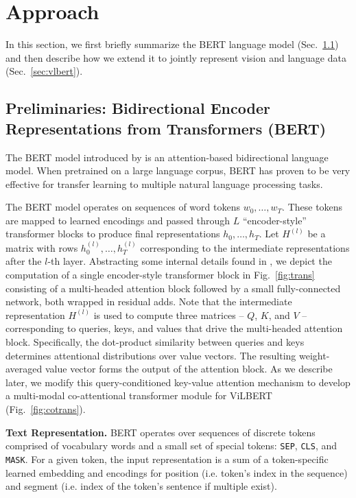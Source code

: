 \section{Approach}
\label{sec:app}

In this section, we first briefly summarize the BERT language model (Sec.~\ref{sec:bert}) and then describe how we extend it to jointly represent vision and language data (Sec.~\ref{sec:vlbert}).

\subsection{Preliminaries: Bidirectional Encoder Representations from Transformers (BERT)}
\label{sec:bert}

The BERT model introduced by \cite{devlin2018bert} is an attention-based bidirectional language model. When pretrained on a large language corpus, BERT has proven to be very effective for transfer learning to multiple natural language processing tasks.

The BERT model operates on sequences of word tokens $w_0,\dots, w_T$. These tokens are mapped to learned encodings and passed through  $L$ ``encoder-style'' transformer blocks \cite{vaswani2017attention} to produce final representations $h_0, \dots, h_T$. Let $H^{(l)}$ be a matrix with rows $h^{(l)}_0, \dots, h^{(l)}_T$ corresponding to the intermediate representations after the $l$-th layer. Abstracting some internal details found in \cite{vaswani2017attention}, we depict the computation of a single encoder-style transformer block in Fig.~\ref{fig:trans} consisting of a multi-headed attention block followed by a small fully-connected network, both wrapped in residual adds. Note that the intermediate representation $H^{(l)}$ is used to compute three matrices -- $Q$, $K$, and $V$ -- corresponding to queries, keys, and values that drive the multi-headed attention block. Specifically, the dot-product similarity between queries and keys determines attentional distributions over value vectors. The resulting weight-averaged value vector forms the output of the attention block. As we describe later, we modify this query-conditioned key-value attention mechanism to develop a multi-modal co-attentional transformer module for ViLBERT~  (Fig.~\ref{fig:cotrans}).

\textbf{Text Representation.} BERT operates over sequences of discrete tokens comprised of vocabulary words and a small set of special tokens: \texttt{SEP}, \texttt{CLS}, and \texttt{MASK}. For a given token, the input representation is a sum of a token-specific learned embedding \cite{wu2016google} and encodings for position (i.e. token's index in the sequence) and segment (i.e. index of the token's sentence if multiple exist). 

